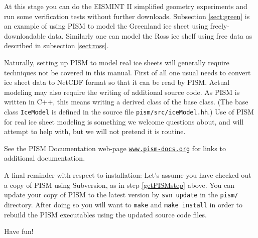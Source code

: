 \documentclass[11pt,final]{amsart}
\renewcommand{\t}[1]{\texttt{#1}}
\begin{document}
At this stage you can do the EISMINT II simplified geometry experiments and run some verification tests without further downloads.  Subsection \ref{sect:green} is an example of using PISM to model the Greenland ice sheet using freely-downloadable data.  Similarly one can model the Ross ice shelf using free data as described in subsection \ref{sect:ross}.

Naturally, setting up PISM to model real ice sheets will generally require techniques not be covered in this manual.  First of all one usual needs to convert ice sheet data to NetCDF format so that it can be read by PISM.  Actual modeling may also require the writing of additional source code.  As PISM is written in C++, this means writing a derived class of the base class.  (The base class \verb|IceModel| is defined in the source file \verb|pism/src/iceModel.hh|.)  Use of PISM for real ice sheet modeling is something we welcome questions about, and will attempt to help with, but we will not pretend it is routine.

See the PISM Documentation web-page \href{http://www.pism-docs.org/}{\t{www.pism-docs.org}} for links to additional documentation.

A final reminder with respect to installation:  Let's assume you have checked out a copy of PISM using Subversion, as in step \ref{getPISMstep} above.   You can update your copy of PISM to the latest version by \verb|svn update| in the \verb|pism/| directory.  After doing so you will want to \verb|make| and \verb|make install| in order to rebuild the PISM executables using the updated source code files.

Have fun!
\end{document}
